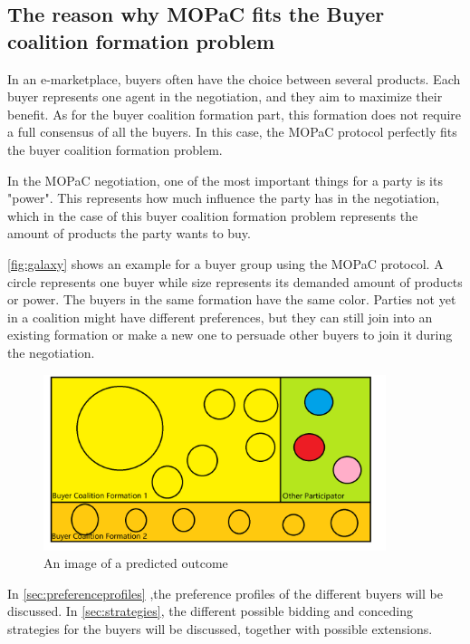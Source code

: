     \subsection*{The reason why MOPaC fits the Buyer coalition formation problem}

        In an e-marketplace, buyers often have the choice between several products. Each buyer represents one agent in the negotiation, and they aim to maximize their benefit. As for the buyer coalition formation part, this formation does not require a full consensus of all the buyers. In this case, the MOPaC protocol perfectly fits the buyer coalition formation problem.

        In the MOPaC negotiation, one of the most important things for a party is its "power". This represents how much influence the party has in the negotiation, which in the case of this buyer coalition formation problem represents the amount of products the party wants to buy. 

        \autoref{fig:galaxy} shows an example for a buyer group using the MOPaC protocol. A circle represents one buyer while size represents its demanded amount of products or power. The buyers in the same formation have the same color. Parties not yet in a coalition might have different preferences, but they can still join into an existing formation or make a new one to persuade other buyers to join it during the negotiation. 

        \begin{figure}[htp]
            \centering
            \includegraphics[width=10cm]{figures/Predicted Outcome Example.png}
            \caption{An image of a predicted outcome}
            \label{fig:galaxy}
        \end{figure}

    In \autoref{sec:preferenceprofiles} ,the preference profiles of the different buyers will be discussed. In \autoref{sec:strategies}, the different possible bidding and conceding strategies for the buyers will be discussed, together with possible extensions. 




